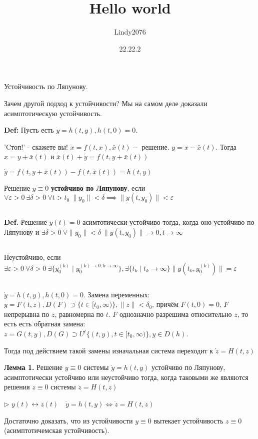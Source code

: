 \documentclass[12pt, a4paper]{article}
\title{Hello world}
\author{Lindy2076}
\date{22.22.2} %
\begin{document}
  Устойчивость по Ляпунову.

  Зачем другой подход к устойчивости? Мы на самом деле доказали асимптотическую устойчивость.
  
  \textbf{Def:} Пусть есть $\dot y = h(t,y), h(t,0) = 0$.

  'Cтоп!' - скажете вы! $\dot x = f(t,x), \bar x(t) - $ решение. $y = x - \bar x(t)$.
  Тогда $x = y + \bar x(t)$ и $\dot{\overline{x}}(t) + \dot y = f(t, y + \bar x(t))$
  
  $\dot y = f(t,y + \bar x(t)) - f(t, \bar x(t)) = h(t,y)$

  Решение $y\equiv 0$ \textbf{устойчиво по Ляпунову}, если $\forall \varepsilon > 0 \ \exists \delta > 0 \ \forall t > t_0 \ \|y_0\| < \delta \implies \| y(t, y_0) \| < \varepsilon$

  \par $ $

  \textbf{Def.} Решение $y(t) = 0$ асимтотически устойчиво тогда, когда оно устойчиво по Ляпунову и $\exists \delta > 0 \ \forall \| y_0 \| < \delta \ \| y(t, y_0) \| \to 0, t \to \infty$

  \par $ $

  Неустойчиво, если $\exists \varepsilon >0 \ \forall \delta > 0 \ \exists \{y_0^{(k)}\mid y_0^{(k) \to 0, k \to \infty}\}, \exists \{t_k \mid t_k \to \infty\} \| y(t_k, y_0^{(k)}) \| = \varepsilon$

  \par $ $ 

  $\dot y = h(t,y), h(t,0) = 0$. Замена переменных: $y = F(t,z), D(F) \supset \{t \in [t_0, \infty)\}, \|z\| < \delta_0$, причём $F(t,0) = 0$, $F$ непрерывна по $z$, 
  равномерна по $t$. $F$ однозначно разрешима относительно $z$, то есть есть обратная замена: 
  $z = G(t,y), D(G) \supset U^t\{(t,y), t\in [t_0, \infty)\}, y \in D(h)$.

  Тогда под действием такой замены изначальная система переходит к $\dot z =  H(t,z)$

  \textbf{Лемма 1.} Решение $y\equiv 0$ системы $\dot y = h(t,y)$ устойчиво по Ляпунову, асимптотически устойчиво или неустойчиво тогда, когда таковыми же являются решения $z\equiv 0$ системы $\dot z = H(t,z)$ 

  $\triangleright$ $y(t) \leftrightarrow z(t) \quad \dot y = h(t,y) \iff \dot z = H(t,z)$

  Достаточно доказать, что из устойчивости $y\equiv 0 $ вытекает устойчивость $z\equiv 0$ (асимптотичемская устойчивость).
\end{document}
